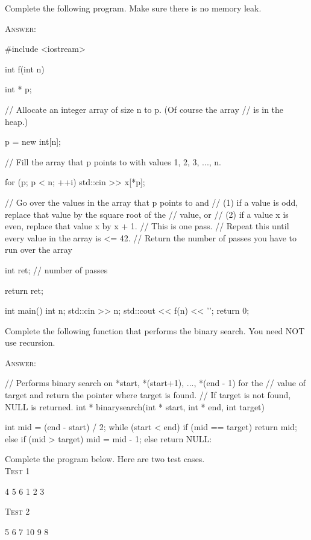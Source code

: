 \newpage
\nextq
Complete the following program. Make sure there is no memory leak.

\textsc{Answer:}\vspace{-3mm}
\begin{answercode}
#include <iostream>

int f(int n)
{
    int * p;

    // Allocate an integer array of size n to p. (Of course the array
    // is in the heap.)
    
    p = new int[n];

    // Fill the array that p points to with values 1, 2, 3, ..., n.

    for (p; p < n; ++i)
    {
      std::cin >> x[*p];
    }

    // Go over the values in the array that p points to and 
    // (1) if a value is odd, replace that value by the square root of the
    //     value, or
    // (2) if a value x is even, replace that value x by x + 1. 
    // This is one pass.
    // Repeat this until every value in the array is <= 42.
    // Return the number of passes you have to run over the array

    int ret; // number of passes

    return ret;
}

int main()
{
    int n;
    std::cin >> n;
    std::cout << f(n) << '\n';
    return 0;
}
\end{answercode}

\newpage
\nextq
Complete the following function that performs the binary search.
You need NOT use recursion.
    
\textsc{Answer:}\vspace{-2mm}
\begin{answercode}
// Performs binary search on *start, *(start+1), ..., *(end - 1) for the
// value of target and return the pointer where target is found.
// If target is not found, NULL is returned.
int * binarysearch(int * start, int * end, int target)
{
  int mid = (end - start) / 2;
  while (start < end)
  {
    if (mid == target)
    {
      return mid;
    }
    else if (mid > target)
    {
      mid = mid - 1;
    }
    else
    {
      return NULL:
    }
  }

}
\end{answercode}

\newpage
\nextq
Complete the program below. Here are two test cases.
\\
\textsc{Test 1}
\begin{console}[commandchars=\\\{\}]
4 5 6
1 2 3
\end{console}
\textsc{Test 2}
\begin{console}[commandchars=\\\{\}]
5 6 7
10 9 8
\end{console}

